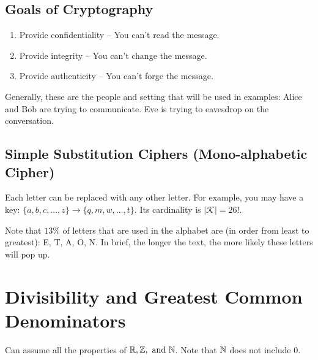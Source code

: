 \subsection{Goals of Cryptography}

\begin{enumerate}
    \item Provide confidentiality -- You can't read the message.
    \item Provide integrity -- You can't change the message.
    \item Provide authenticity -- You can't forge the message.
\end{enumerate}

Generally, these are the people and setting that will be used in examples: Alice and Bob are trying to communicate. Eve is trying to eavesdrop on the conversation. \\

\subsection{Simple Substitution Ciphers (Mono-alphabetic Cipher)}

Each letter can be replaced with any other letter. For example, you may have a key: $\{a,b,c,\dots,z\} \rightarrow \{q,m,w,\dots,t\}$. Its cardinality is $|\mathcal{K}| = 26!$. \\



 Note that $13\%$ of letters that are used in the alphabet are (in order from least to greatest): E, T, A, O, N. In brief, the longer the text, the more likely these letters will pop up.

\section{Divisibility and Greatest Common Denominators}

Can assume all the properties of $\mathbb{R}, \mathbb{Z}, \text{ and } \mathbb{N}$. Note that $\mathbb{N}$ does not include 0. \\


